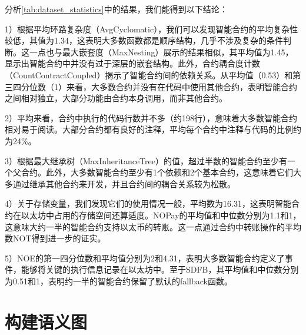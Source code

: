 分析\autoref{tab:dataset_statistics}中的结果，我们能得到以下结论：

1）根据平均环路复杂度（AvgCyclomatic），我们可以发现智能合约的平均复杂性较低，其值为1.34，这表明大多数函数都是顺序结构，几乎不涉及复杂的条件判断。这一点也与最大嵌套度（MaxNesting）展示的结果相似，其平均值为1.45，显示出智能合约中并没有过于深层的嵌套结构。此外，合约耦合度计数（CountContractCoupled）揭示了智能合约间的依赖关系。从平均值（0.53）和第三四分位数（1）来看，大多数合约并没有在代码中使用其他合约，表明智能合约之间相对独立，大部分功能由合约本身调用，而非其他合约。

2）平均来看，合约中执行的代码行数并不多（约198行），意味着大多数智能合约相对易于阅读。大部分合约都有良好的注释，平均每个合约中注释与代码的比例约为24\%。

3）根据最大继承树（MaxInheritanceTree）的值，超过半数的智能合约至少有一个父合约。此外，大多数智能合约至少有1个依赖和2个基本合约，这意味着它们大多通过继承其他合约来开发，并且合约间的耦合关系较为松散。

4）关于存储变量，我们发现它们的使用情况一般，平均数为16.31，这表明智能合约在以太坊中占用的存储空间还算适度。NOPay的平均值和中位数分别为1.1和1，这意味大约一半的智能合约支持以太币的转账。这一点通过合约中转账操作的平均数NOT得到进一步的证实。

5）NOE的第一四分位数和平均值分别为2和4.31，表明大多数智能合约定义了事件，能够将关键的执行信息记录在以太坊中。至于SDFB，其平均值和中位数分别为0.51和1，表明约一半的智能合约保留了默认的fallback函数。
\section{构建语义图}
\label{sec:构建语义图}
